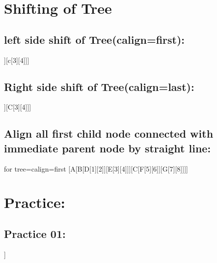 \documentclass{article}
\begin{document}
	\section{Shifting of Tree}
		\subsection{left side shift of Tree(calign=first):}
		\begin{forest}
			[A,calign=first[B[1][2]][c[3][4]]]
		\end{forest}
		
		\subsection{Right side shift of Tree(calign=last):}
		\begin{forest}
			[A,calign=last[B[1][2]][C[3][4]]]
		\end{forest}
		
		\subsection{Align all first child node connected with immediate parent node by straight line:}
		\begin{forest} for tree={calign=first}
			[A[B[D[1][2]][E[3][4]]][C[F[5][6]][G[7][8]]]]
		\end{forest}
		
	\section{Practice:}
		\subsection{Practice 01:}
		\begin{forest}
			[A,circle,draw
				[B]
				[C, name=Cnode]
			]
		\end{forest}
		
		
		
\end{document}

